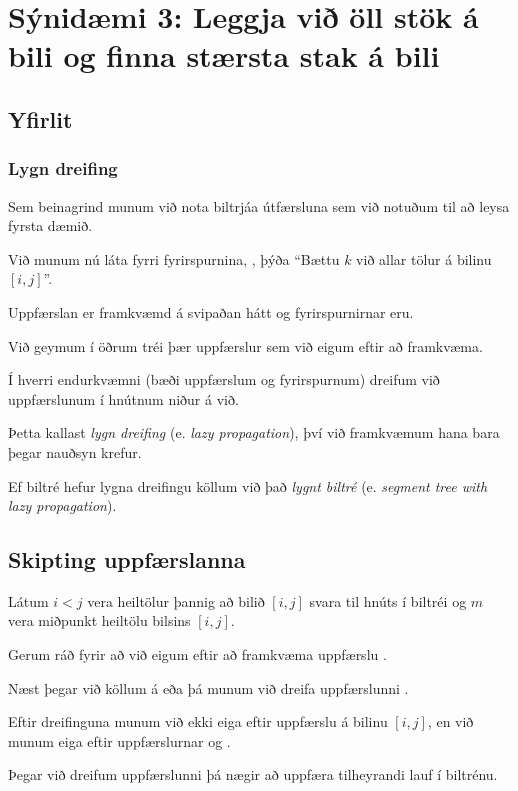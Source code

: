 \section{Sýnidæmi 3: Leggja við öll stök á bili og finna stærsta stak á bili}
\subsection{Yfirlit}
{
	\frametitle{Lygn dreifing}
	{
		\item<1-> Sem beinagrind munum við nota biltrjáa útfærsluna sem við notuðum til að leysa fyrsta dæmið.
		\item<2-> Við munum nú láta fyrri fyrirspurnina, , þýða ``Bættu $k$ við allar tölur á bilinu $[i, j]$''.
		\item<3-> Uppfærslan er framkvæmd á svipaðan hátt og fyrirspurnirnar eru.
		\item<4-> Við geymum í öðrum tréi þær uppfærslur sem við eigum eftir að framkvæma.
		\item<5-> Í hverri endurkvæmni (bæði uppfærslum og fyrirspurnum) dreifum við uppfærslunum í hnútnum niður á við.
		\item<6-> Þetta kallast \emph{lygn dreifing} (e. \emph{lazy propagation}), því við framkvæmum hana bara þegar nauðsyn krefur.
		\item<7-> Ef biltré hefur lygna dreifingu köllum við það \emph{lygnt biltré} (e. \emph{segment tree with lazy propagation}).
	}
}

\subsection{Skipting uppfærslanna}
{
	{
		\item<1-> Látum $i < j$ vera heiltölur þannig að bilið $[i, j]$ svara til hnúts í biltréi og $m$ vera miðpunkt heiltölu bilsins $[i, j]$.
		\item<2-> Gerum ráð fyrir að við eigum eftir að framkvæma uppfærslu .
		\item<3-> Næst þegar við köllum á  eða 
					þá munum við dreifa uppfærslunni .
		\item<4-> Eftir dreifinguna munum við ekki eiga eftir uppfærslu á bilinu $[i, j]$, en við munum eiga eftir uppfærslurnar
					 og .
		\item<5-> Þegar við dreifum uppfærslunni  þá nægir að uppfæra tilheyrandi lauf í biltrénu.
	}
}

